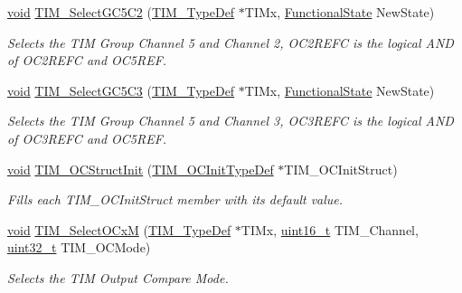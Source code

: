 \begin{DoxyCompactItemize}
\hyperlink{group___n_a_m_e_ga18028b8badbf1ea7e704ccac3c488e82}{void} \hyperlink{group___t_i_m___group2_gac6858ba34edb61abc851f67b3676753f}{T\-I\-M\-\_\-\-Select\-G\-C5\-C2} (\hyperlink{struct_t_i_m___type_def}{T\-I\-M\-\_\-\-Type\-Def} $\ast$T\-I\-Mx, \hyperlink{group___exported__types_gac9a7e9a35d2513ec15c3b537aaa4fba1}{Functional\-State} New\-State)
\begin{DoxyCompactList}\small\item\em Selects the T\-I\-M Group Channel 5 and Channel 2, O\-C2\-R\-E\-F\-C is the logical A\-N\-D of O\-C2\-R\-E\-F\-C and O\-C5\-R\-E\-F. \end{DoxyCompactList}\item 
\hyperlink{group___n_a_m_e_ga18028b8badbf1ea7e704ccac3c488e82}{void} \hyperlink{group___t_i_m___group2_ga06c9c07c73dec20da53e8718ef225810}{T\-I\-M\-\_\-\-Select\-G\-C5\-C3} (\hyperlink{struct_t_i_m___type_def}{T\-I\-M\-\_\-\-Type\-Def} $\ast$T\-I\-Mx, \hyperlink{group___exported__types_gac9a7e9a35d2513ec15c3b537aaa4fba1}{Functional\-State} New\-State)
\begin{DoxyCompactList}\small\item\em Selects the T\-I\-M Group Channel 5 and Channel 3, O\-C3\-R\-E\-F\-C is the logical A\-N\-D of O\-C3\-R\-E\-F\-C and O\-C5\-R\-E\-F. \end{DoxyCompactList}\item 
\hyperlink{group___n_a_m_e_ga18028b8badbf1ea7e704ccac3c488e82}{void} \hyperlink{group___t_i_m___group2_ga394683c78ae02837882e36014e11643e}{T\-I\-M\-\_\-\-O\-C\-Struct\-Init} (\hyperlink{struct_t_i_m___o_c_init_type_def}{T\-I\-M\-\_\-\-O\-C\-Init\-Type\-Def} $\ast$T\-I\-M\-\_\-\-O\-C\-Init\-Struct)
\begin{DoxyCompactList}\small\item\em Fills each T\-I\-M\-\_\-\-O\-C\-Init\-Struct member with its default value. \end{DoxyCompactList}\item 
\hyperlink{group___n_a_m_e_ga18028b8badbf1ea7e704ccac3c488e82}{void} \hyperlink{group___t_i_m___group2_ga82bb30a12b758ffb1fd47fd2981a25a5}{T\-I\-M\-\_\-\-Select\-O\-Cx\-M} (\hyperlink{struct_t_i_m___type_def}{T\-I\-M\-\_\-\-Type\-Def} $\ast$T\-I\-Mx, \hyperlink{stdint_8h_a273cf69d639a59973b6019625df33e30}{uint16\-\_\-t} T\-I\-M\-\_\-\-Channel, \hyperlink{stdint_8h_a435d1572bf3f880d55459d9805097f62}{uint32\-\_\-t} T\-I\-M\-\_\-\-O\-C\-Mode)
\begin{DoxyCompactList}\small\item\em Selects the T\-I\-M Output Compare Mode. \end{DoxyCompactList}\item 

\end{DoxyCompactItemize}
